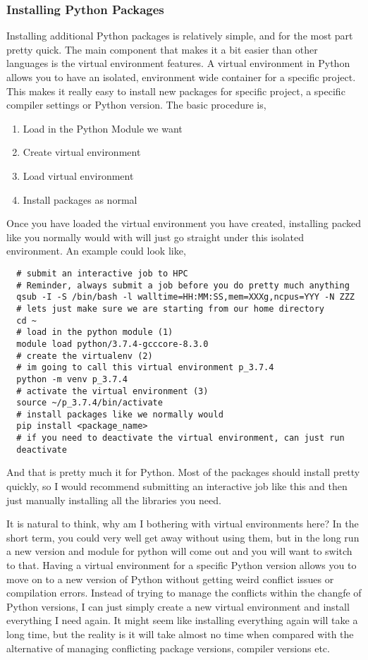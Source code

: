 \subsubsection{Installing Python Packages}
\label{sec:install_python}
% 
%
Installing additional Python packages is relatively simple, and for the most part pretty quick. The main component that makes it a bit easier than other languages is the virtual environment  features. A virtual environment in Python allows you to have an isolated, environment wide container for a specific project. This makes it really easy to install new packages for specific project, a specific compiler settings or Python version. The basic procedure is,
%
%
%
\begin{enumerate}
  \item Load in the Python Module we want
  \item Create virtual environment
  \item Load virtual environment
  \item Install packages as normal
\end{enumerate}
%
%
Once you have loaded the virtual environment you have created, installing packed like you normally would with  will just go straight under this isolated environment. An example could look like,
%
%
%
\begin{verbatim}
  # submit an interactive job to HPC
  # Reminder, always submit a job before you do pretty much anything
  qsub -I -S /bin/bash -l walltime=HH:MM:SS,mem=XXXg,ncpus=YYY -N ZZZ
  # lets just make sure we are starting from our home directory
  cd ~
  # load in the python module (1)
  module load python/3.7.4-gcccore-8.3.0
  # create the virtualenv (2)
  # im going to call this virtual environment p_3.7.4
  python -m venv p_3.7.4
  # activate the virtual environment (3)
  source ~/p_3.7.4/bin/activate
  # install packages like we normally would
  pip install <package_name>
  # if you need to deactivate the virtual environment, can just run
  deactivate
\end{verbatim}
%
%
And that is pretty much it for Python. Most of the packages should install pretty quickly, so I would recommend submitting an interactive job like this and then just manually installing all the libraries you need.
%
%
\par
%
%
It is natural to think, why am I bothering with virtual environments here? In the short term, you could very well get away without using them, but in the long run a new version and module for python will come out and you will want to switch to that. Having a virtual environment for a specific Python version allows you to move on to a new version of Python without getting weird conflict issues or compilation errors. Instead of trying to manage the conflicts within the changfe of Python versions, I can just simply create a new virtual environment and install everything I need again. It might seem like installing everything again will take a long time, but the reality is it will take almost no time when compared with the alternative of managing conflicting package versions, compiler versions etc.
